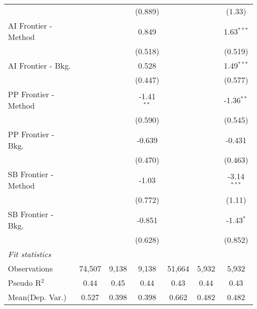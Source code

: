 \begin{tabular}{lcccccc}
                        &               &              & (0.889)      &               &         & (1.33)\\   
   AI Frontier - Method &               &              & 0.849        &               &         & 1.63$^{***}$\\   
                        &               &              & (0.518)      &               &         & (0.519)\\   
   AI Frontier - Bkg.   &               &              & 0.528        &               &         & 1.49$^{***}$\\   
                        &               &              & (0.447)      &               &         & (0.577)\\   
   PP Frontier - Method &               &              & -1.41$^{**}$ &               &         & -1.36$^{**}$\\   
                        &               &              & (0.590)      &               &         & (0.545)\\   
   PP Frontier - Bkg.   &               &              & -0.639       &               &         & -0.431\\   
                        &               &              & (0.470)      &               &         & (0.463)\\   
   SB Frontier - Method &               &              & -1.03        &               &         & -3.14$^{***}$\\   
                        &               &              & (0.772)      &               &         & (1.11)\\   
   SB Frontier - Bkg.   &               &              & -0.851       &               &         & -1.43$^{*}$\\   
                        &               &              & (0.628)      &               &         & (0.852)\\   
   \midrule
   \emph{Fit statistics}\\
   Observations         & 74,507        & 9,138        & 9,138        & 51,664        & 5,932   & 5,932\\  
   Pseudo R$^2$         & 0.44          & 0.45         & 0.44         & 0.43          & 0.44    & 0.43\\  
Mean(Dep. Var.) & 0.527 & 0.398 & 0.398 & 0.662 & 0.482 & 0.482 \\
   

\end{tabular}

